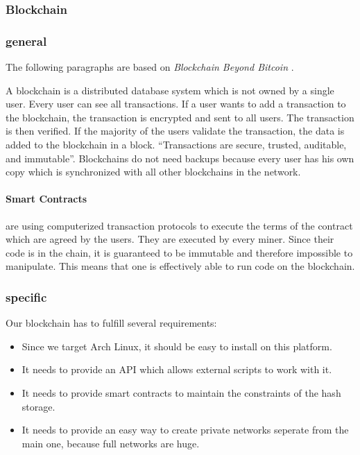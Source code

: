 \subsubsection{Blockchain} \label{sec:blockchain}

\subsubsection*{general}
The following paragraphs are based on \emph{Blockchain Beyond Bitcoin} \cite{Underwood}.

A blockchain is a distributed database system which is not owned by a single user. Every user can see all transactions. If a user wants to add a transaction to the blockchain, the transaction is encrypted and sent to all users. The transaction is then verified. If the majority of the users validate the transaction, the data is added to the blockchain in a block. ``Transactions are secure, trusted, auditable, and immutable''. Blockchains do not need backups because every user has his own copy which is synchronized with all other blockchains in the network.

\paragraph*{Smart Contracts} are using computerized transaction protocols to execute the terms of the contract which are agreed by the users. They are executed by every miner. Since their code is in the chain, it is guaranteed to be immutable and therefore impossible to manipulate. This means that one is effectively able to run code on the blockchain.

\subsubsection*{specific}
Our blockchain has to fulfill several requirements:
\begin{itemize}
	\item Since we target Arch Linux, it should be easy to install on this platform.
	\item It needs to provide an API which allows external scripts to work with it.
	\item It needs to provide smart contracts to maintain the constraints of the hash storage.
	\item It needs to provide an easy way to create private networks seperate from the main one, because full networks are huge.
\end{itemize}

